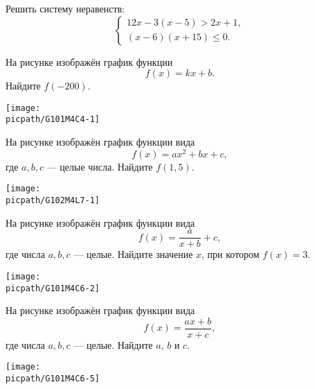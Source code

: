 \begin{exam}
	\begin{listofex}
		\item Решить систему неравенств:
		\[ \left\{
		\begin{array}{l}
			12x-3(x-5)>2x+1,\\
			(x-6)(x+15)\le0.
		\end{array}
		\right. \]
		\item
		\begin{minipage}[t]{\bodywidth}
			На рисунке изображён график функции \[ f(x)=kx+b. \] Найдите \(f(-200)\).
		\end{minipage}
		\hspace{0.02\linewidth}
		\begin{minipage}[t]{\picwidth}
			\texttt{[image: \\picpath/G101M4C4-1]}
		\end{minipage}
		\item
		\begin{minipage}[t]{\bodywidth}
			На рисунке изображён график функции вида \[ f(x)=ax^2+bx+c, \] где  \(a, b, c\) --- целые числа. Найдите \(f(1,5)\).
		\end{minipage}
		\hspace{0.02\linewidth}
		\begin{minipage}[t]{\picwidth}
			\texttt{[image: \\picpath/G102M4L7-1]}
		\end{minipage}
		\item
		\begin{minipage}[t]{\bodywidth}
			На рисунке изображён график функции вида \[ f(x)=\dfrac{a}{x+b}+c, \] где числа \(a, b, c\) --- целые. Найдите значение \(x\), при котором \(f(x)=3\).
		\end{minipage}
		\hspace{0.02\linewidth}
		\begin{minipage}[t]{\picwidth}
			\texttt{[image: \\picpath/G101M4C6-2]}
		\end{minipage}
		\item
		\begin{minipage}[t]{\bodywidth}
			На рисунке изображён график функции вида \[ f(x)=\dfrac{ax+b}{x+c}, \] где числа \(a, b, c\) --- целые. Найдите \( a \), \( b \) и \( c \).
		\end{minipage}
		\hspace{0.02\linewidth}
		\begin{minipage}[t]{\picwidth}
			\texttt{[image: \\picpath/G101M4C6-5]}

\end{minipage}
\end{listofex}
\end{exam}
